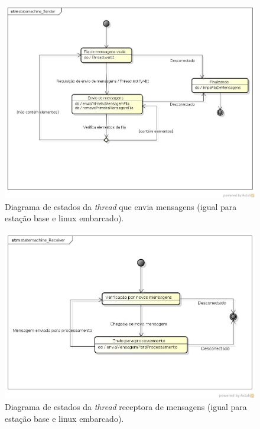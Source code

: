 \begin{figure}[H]
  \centering
  \includegraphics[width=\textwidth, keepaspectratio]{./figuras/statemachine_Sender.jpg}
  \caption{Diagrama de estados da \textit{thread} que envia mensagens (igual para estação base e linux embarcado).}
  \label{fig:diagrama_estados_sender}
\end{figure}

\begin{figure}[H]
  \centering
  \includegraphics[width=\textwidth, keepaspectratio]{./figuras/statemachine_Receiver.jpg}
  \caption{Diagrama de estados da \textit{thread} receptora de mensagens (igual para estação base e linux embarcado).}
  \label{fig:diagrama_estados_receiver}
\end{figure}

